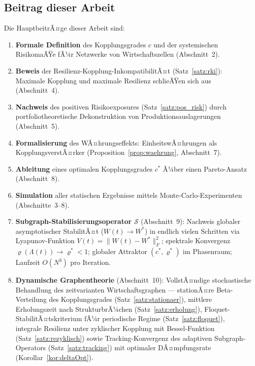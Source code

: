 ﻿\documentclass[a4paper,12pt]{article}
\theoremstyle{definition}
\begin{document}
\subsection{Beitrag dieser Arbeit}

Die HauptbeitrÃ¤ge dieser Arbeit sind:

\begin{enumerate}
    \item \textbf{Formale Definition} des Kopplungsgrades $c$ und der systemischen RisikomaÃŸe
          fÃ¼r Netzwerke von Wirtschaftszellen (Abschnitt~2).
    \item \textbf{Beweis} der Resilienz-Kopplung-InkompatibilitÃ¤t (Satz~\ref{satz:rki}):
          Maximale Kopplung und maximale Resilienz schlieÃŸen sich aus (Abschnitt~4).
    \item \textbf{Nachweis} des positiven Risikoexposures (Satz~\ref{satz:pos_risk}) durch
          portfoliotheoretische Dekonstruktion von Produktionsauslagerungen (Abschnitt~5).
    \item \textbf{Formalisierung} des WÃ¤hrungseffekts: EinheitswÃ¤hrungen als
          KopplungsverstÃ¤rker (Proposition~\ref{prop:waehrung}, Abschnitt~7).
    \item \textbf{Ableitung} eines optimalen Kopplungsgrades $c^*$ Ã¼ber einen
          Pareto-Ansatz (Abschnitt~8).
    \item \textbf{Simulation} aller statischen Ergebnisse mittels Monte-Carlo-Experimenten
          (Abschnitte~3--8).
    \item \textbf{Subgraph-Stabilisierungsoperator $\mathcal{S}$} (Abschnitt~9):
          Nachweis globaler asymptotischer StabilitÃ¤t ($W(t)\to W^*$) in endlich vielen
          Schritten via Lyapunov-Funktion $V(t)=\|W(t)-W^*\|_F^2$; spektrale Konvergenz
          $\varrho(\Lambda(t))\to\varrho^*<1$; globaler Attraktor $(c^*,\varrho^*)$
          im Phasenraum; Laufzeit $O(N^3)$ pro Iteration.
    \item \textbf{Dynamische Graphentheorie} (Abschnitt~10): VollstÃ¤ndige stochastische
          Behandlung des zeitvarianten Wirtschaftsgraphen --- stationÃ¤re Beta-Verteilung
          des Kopplungsgrades (Satz~\ref{satz:stationaer}), mittlere Erholungszeit nach
          StrukturbrÃ¼chen (Satz~\ref{satz:erholung}), Floquet-StabilitÃ¤tskriterium fÃ¼r
          periodische Regime (Satz~\ref{satz:floquet}), integrale Resilienz unter
          zyklischer Kopplung mit Bessel-Funktion (Satz~\ref{satz:rezyklisch}) sowie
          Tracking-Konvergenz des adaptiven Subgraph-Operators (Satz~\ref{satz:tracking})
          mit optimaler DÃ¤mpfungsrate (Korollar~\ref{kor:deltaOpt}).
\end{enumerate}
\end{document}
